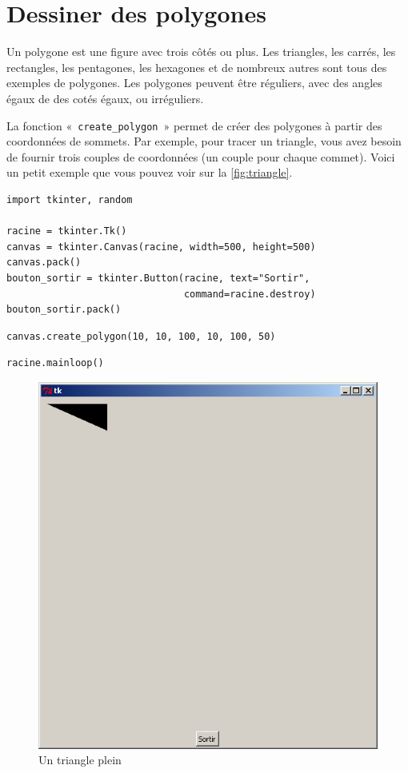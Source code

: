 \section{Dessiner des polygones}
Un polygone est une figure avec trois côtés ou plus. 
Les triangles, les carrés, les rectangles, les pentagones, les hexagones et de nombreux autres sont tous des exemples de polygones. Les polygones peuvent être réguliers, avec des angles égaux de des cotés égaux, ou irréguliers. 

La fonction «~\texttt{create\_polygon}~» permet de créer des polygones à partir des coordonnées de sommets.
Par exemple, pour tracer un triangle, vous avez besoin de fournir trois couples de coordonnées (un couple pour chaque commet). Voici un petit exemple que vous pouvez voir sur la \autoref{fig:triangle}.

\begin{Verbatim}[frame=single,rulecolor=\color{mbleu}, label=à taper ne sera pas répété]
import tkinter, random

racine = tkinter.Tk()
canvas = tkinter.Canvas(racine, width=500, height=500)
canvas.pack()
bouton_sortir = tkinter.Button(racine, text="Sortir",
                               command=racine.destroy)
bouton_sortir.pack()
\end{Verbatim}
\begin{Verbatim}[frame=single,rulecolor=\color{mbleu}, label=à taper]
canvas.create_polygon(10, 10, 100, 10, 100, 50)
\end{Verbatim}
\begin{Verbatim}[frame=single,rulecolor=\color{mbleu}, label=à taper ne sera pas répété]
racine.mainloop()
\end{Verbatim}

\begin{figure}[h!]
\centering
\includegraphics[scale=0.4]{images/triangle}
\caption{Un triangle plein}\label{fig:triangle}
\end{figure}

